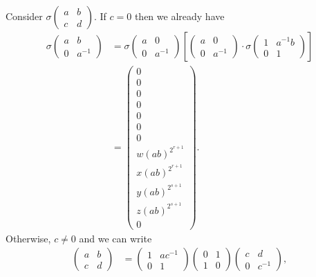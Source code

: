 Consider
$\sigma\left(\begin{matrix} a & b \\ c & d \end{matrix}\right)$.
If $c=0$ then we already have
\begin{align*}
\sigma\left(\begin{matrix} a & b \\ 0 & a^{-1} \end{matrix}\right) &=
\sigma\left(\begin{matrix} a & 0 \\ 0 & a^{-1} \end{matrix}\right) \left[
\left(\begin{matrix} a & 0 \\ 0 & a^{-1} \end{matrix}\right)\cdot
\sigma\left(\begin{matrix} 1 & a^{-1}b \\ 0 & 1 \end{matrix}\right) \right]\\
&=
\left( \begin{matrix}
0 \\
0 \\
0 \\
0 \\
0 \\
0 \\
0 \\
w(ab)^{2^{r+1}} \\
x(ab)^{2^{r+1}} \\
y(ab)^{2^{s+1}} \\
z(ab)^{2^{s+1}} \\
0
\end{matrix} \right).
\end{align*}
Otherwise, $c\neq 0$ and we can write
\begin{align*}
\left(\begin{matrix} a & b \\ c & d \end{matrix}\right) &= 
\left(\begin{matrix} 1 & ac^{-1} \\ 0 & 1 \end{matrix}\right)
\left(\begin{matrix} 0 & 1 \\ 1 & 0 \end{matrix}\right)
\left(\begin{matrix} c & d \\ 0 & c^{-1} \end{matrix}\right),
\end{align*}

